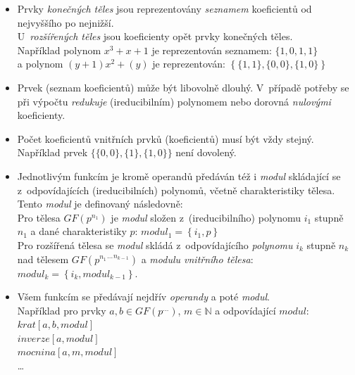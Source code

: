 \documentclass[thesis=M,czech,hidelinks]{FITthesis}[2012/06/26]
\newcommand{\0}{{\textcolor[gray]{0.80}{0}}}
\begin{document}
\begin{itemize}
    \item Prvky \emph{konečných těles} jsou reprezentovány \emph{seznamem}
        koeficientů od nejvyššího po nejnižší. \\ U~\emph{rozšířených těles}
        jsou koeficienty opět prvky konečných těles. \\
        Například polynom $x^3+x+1$ je reprezentován seznamem: $\{1,0,1,1\}$ \\
        a polynom $(y+1)x^2 + (y)$ je reprezentován:
        $\left\{\{1,1\},\{0,0\},\{1,0\}\right\}$

    \item Prvek (seznam koeficientů) může být libovolně dlouhý. V~případě
        potřeby se při výpočtu \emph{redukuje} (ireducibilním) polynomem nebo
        dorovná \emph{nulovými} koeficienty.

    \item Počet koeficientů vnitřních prvků (koeficientů) musí být vždy stejný. \\
        Například prvek $\{\{0,0\},\{1\},\{1,0\}\}$ není dovolený.

    \item Jednotlivým funkcím je kromě operandů předáván též i \emph{modul}
        skládající se z~odpovídajících (ireducibilních) polynomů, včetně
        charakteristiky tělesa. Tento \emph{modul} je definovaný následovně: \\
        Pro tělesa $GF(p^{n_1})$ je \emph{modul} složen z~(ireducibilního)
        polynomu $i_1$ stupně $n_1$ a dané charakteristiky $p$:
        $modul_1 = \left\{i_1,p\right\}$ \\
        Pro rozšířená tělesa se \emph{modul} skládá z~odpovídajícího
        \emph{polynomu} $i_k$ stupně $n_k$ nad tělesem
        $GF( {{p^{n_1}}^{\dots}}^{n_{k-1}} )$ a \emph{modulu vnitřního tělesa}: \\
        $modul_k = \left\{i_k,modul_{k-1}\right\}$.

    \item Všem funkcím se předávají nejdřív \emph{operandy} a poté \emph{modul}.\\
        Například pro prvky $a,b\in GF(p^{\ldots})$, $m\in\mathbb{N}$
        a odpovídající $modul$: \\
        \hspace*{0.6cm}$krat[a,b,modul]$ \\
        \hspace*{0.6cm}$inverze[a,modul]$ \\
        \hspace*{0.6cm}$mocnina[a,m,modul]$ \\
        \hspace*{0.6cm}\ldots


\end{itemize}
\end{document}
